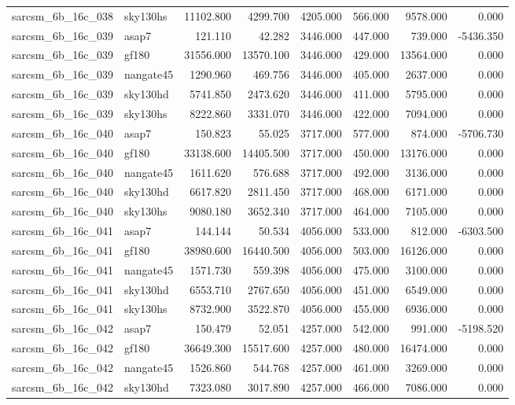 \begin{tabular}{llrrrrrr}
sarcsm\_6b\_16c\_038 & sky130hs & 11102.800 & 4299.700 & 4205.000 & 566.000 & 9578.000 & 0.000 \\
sarcsm\_6b\_16c\_039 & asap7 & 121.110 & 42.282 & 3446.000 & 447.000 & 739.000 & -5436.350 \\
sarcsm\_6b\_16c\_039 & gf180 & 31556.000 & 13570.100 & 3446.000 & 429.000 & 13564.000 & 0.000 \\
sarcsm\_6b\_16c\_039 & nangate45 & 1290.960 & 469.756 & 3446.000 & 405.000 & 2637.000 & 0.000 \\
sarcsm\_6b\_16c\_039 & sky130hd & 5741.850 & 2473.620 & 3446.000 & 411.000 & 5795.000 & 0.000 \\
sarcsm\_6b\_16c\_039 & sky130hs & 8222.860 & 3331.070 & 3446.000 & 422.000 & 7094.000 & 0.000 \\
sarcsm\_6b\_16c\_040 & asap7 & 150.823 & 55.025 & 3717.000 & 577.000 & 874.000 & -5706.730 \\
sarcsm\_6b\_16c\_040 & gf180 & 33138.600 & 14405.500 & 3717.000 & 450.000 & 13176.000 & 0.000 \\
sarcsm\_6b\_16c\_040 & nangate45 & 1611.620 & 576.688 & 3717.000 & 492.000 & 3136.000 & 0.000 \\
sarcsm\_6b\_16c\_040 & sky130hd & 6617.820 & 2811.450 & 3717.000 & 468.000 & 6171.000 & 0.000 \\
sarcsm\_6b\_16c\_040 & sky130hs & 9080.180 & 3652.340 & 3717.000 & 464.000 & 7105.000 & 0.000 \\
sarcsm\_6b\_16c\_041 & asap7 & 144.144 & 50.534 & 4056.000 & 533.000 & 812.000 & -6303.500 \\
sarcsm\_6b\_16c\_041 & gf180 & 38980.600 & 16440.500 & 4056.000 & 503.000 & 16126.000 & 0.000 \\
sarcsm\_6b\_16c\_041 & nangate45 & 1571.730 & 559.398 & 4056.000 & 475.000 & 3100.000 & 0.000 \\
sarcsm\_6b\_16c\_041 & sky130hd & 6553.710 & 2767.650 & 4056.000 & 451.000 & 6549.000 & 0.000 \\
sarcsm\_6b\_16c\_041 & sky130hs & 8732.900 & 3522.870 & 4056.000 & 455.000 & 6936.000 & 0.000 \\
sarcsm\_6b\_16c\_042 & asap7 & 150.479 & 52.051 & 4257.000 & 542.000 & 991.000 & -5198.520 \\
sarcsm\_6b\_16c\_042 & gf180 & 36649.300 & 15517.600 & 4257.000 & 480.000 & 16474.000 & 0.000 \\
sarcsm\_6b\_16c\_042 & nangate45 & 1526.860 & 544.768 & 4257.000 & 461.000 & 3269.000 & 0.000 \\
sarcsm\_6b\_16c\_042 & sky130hd & 7323.080 & 3017.890 & 4257.000 & 466.000 & 7086.000 & 0.000 \\

\end{tabular}
